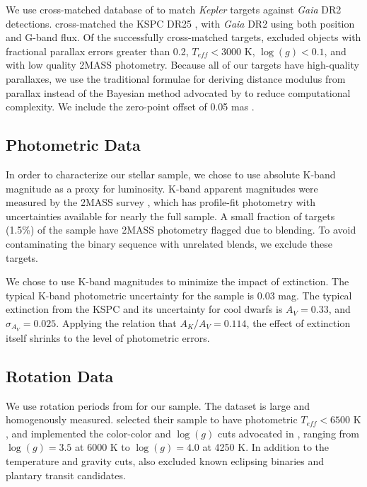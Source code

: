 \documentclass[manuscript]{aastex6}
\newcommand{\Kepler}{\mbox{\textit{Kepler}}}
\newcommand{\Gaia}{\mbox{\textit{Gaia}}}
\newcommand{\Teff}{\ensuremath{T_{eff}}}
\newcommand{\logg}{\ensuremath{\log(g)}}
\newcommand{\gvs}{\authorcomment1}
\begin{document}
We use  cross-matched database of \citet{Berger18b} to match \Kepler{} targets
against \Gaia{} DR2 detections.
\citet{Berger18b} cross-matched the KSPC DR25 \citep{Mathur17}, with \Gaia{} 
DR2 using both position and G-band flux. Of the successfully cross-matched targets,
\citet{Berger18b} excluded objects with fractional parallax errors greater than
0.2, \(\Teff < 3000\) K, \(\logg < 0.1\), and with low quality 2MASS photometry. 
Because all of our targets have high-quality parallaxes, we use the traditional 
formulae for deriving distance modulus from parallax instead of the Bayesian 
method advocated by \citet{Luri18} to reduce computational complexity. We
include the zero-point offset of 0.05 mas \citep{Zinn18}.

\subsection{Photometric Data}

In order to characterize our stellar sample, we chose to use absolute K-band
magnitude as a proxy for luminosity. K-band apparent magnitudes were measured
by the 2MASS survey \citep{Skrutskie06}, which has profile-fit photometry with 
uncertainties available for nearly the full sample. A small fraction of 
targets (1.5\%) of the \citet{McQuillan14} sample have 2MASS photometry 
flagged due to blending. To avoid contaminating the binary sequence with 
unrelated blends, we exclude these targets.

We chose to use K-band magnitudes to minimize the impact of extinction. The 
typical K-band photometric uncertainty for the \citet{McQuillan14} sample is 
0.03 mag. The typical extinction from the KSPC and its uncertainty for cool 
dwarfs is \(A_V = 0.33\), and \(\sigma_{A_V}=0.025\). Applying the 
\citet{Cardelli89} relation that \(A_K/A_V = 0.114\), the effect of extinction 
itself shrinks to the level of photometric errors. 

\subsection{Rotation Data}

We use rotation periods from \citet{McQuillan14} for our sample. The dataset is
large and homogenously measured. \citet{McQuillan14} selected their sample to 
have photometric \(\Teff < 6500\) K \citep{Brown11,Dressing13}, and implemented the color-color
and \logg{} cuts advocated in \citet{Ciardi11}, ranging from \(\logg = 
3.5\) at 6000 K to \(\logg = 4.0\) at 4250 K. 
In addition to the temperature and gravity cuts, \citet{McQuillan14} also 
excluded known eclipsing binaries and plantary transit candidates. 
\end{document}
